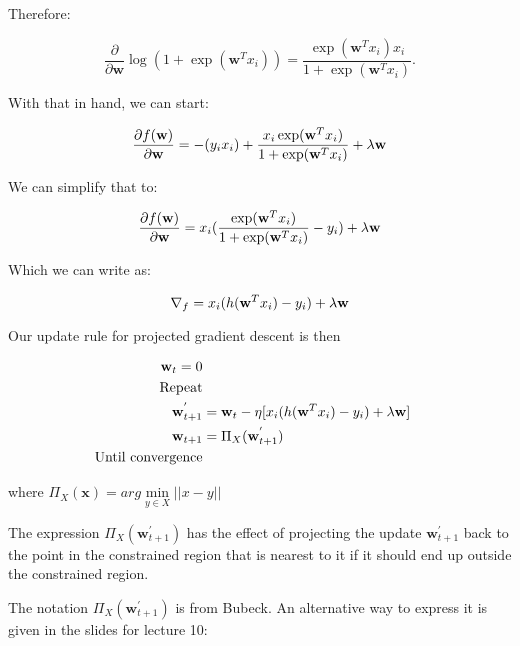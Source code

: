 \documentclass{article}
\begin{document}
Therefore:

\begin{equation}
\frac{\partial}{\partial\mathbf{w}}\log (1 + \exp( \mathbf{w}^Tx_i)) = \frac{\exp( \mathbf{w}^Tx_i)x_i}{1 + \exp( \mathbf{w}^Tx_i)}.
\end{equation}


With that in hand, we can start:

\begin{equation}
\frac{\partial f(\mathbf{w})}{\partial\mathbf{w}} = -(y_i x_i) + \frac{ x_i \exp ( \mathbf{w}^T x_i ) }{ 1 + \exp( \mathbf{w}^T x_i ) } + \lambda \mathbf{w}
\end{equation}

We can simplify that to:

\begin{equation}
\frac{\partial f(\mathbf{w})}{\partial\mathbf{w}} = x_i ( \frac{ \exp ( \mathbf{w}^T x_i ) }{ 1 + \exp( \mathbf{w}^T x_i ) } - y_i) + \lambda \mathbf{w}
\end{equation}

Which we can write as:

\begin{equation}
\nabla_f = x_i ( h(\mathbf{w}^T x_i) - y_i) + \lambda \mathbf{w}
\end{equation}

Our update rule for projected gradient descent is then

\begin{equation}
\begin{aligned}
\mathbf{w}_t = 0 \\
\text{Repeat} \\
\mathbf{w}_{t + 1}^{'} &= \mathbf{w}_t - \eta [x_i ( h(\mathbf{w}^T x_i) - y_i) + \lambda \mathbf{w}] \\
\mathbf{w}_{t + 1} &= \Pi_{X}(\mathbf{w}_{t + 1}^{'}) \\
\text{Until convergence}
\end{aligned}
\end{equation}

where $\Pi_{X}(\mathbf{x}) = arg \min\limits_{y \in X} || x - y ||$

The expression $\Pi_{X}(\mathbf{w}_{t + 1}^{'})$ has the effect of projecting the update $\mathbf{w}_{t + 1}^{'}$ back to the point in the constrained region that is nearest to it if it should end up outside the constrained region.

The notation $\Pi_{X}(\mathbf{w}_{t + 1}^{'})$ is from Bubeck.  An alternative way to express it is given in the slides for lecture 10:
\end{document}
